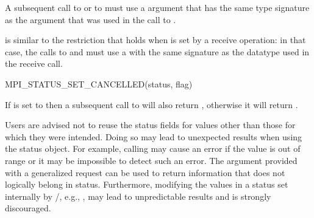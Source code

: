 A subsequent call to  or to
 must use a
 argument that has the same type signature as the
 argument that was used in the call to
.

\begin{rationale}
 is similar to the restriction that holds 
when 
 is set by a
receive operation: in that case, the calls to
 and  must use a
 with the same signature as the datatype used in the
receive call.
\end{rationale}

\begin{funcdef}{MPI\_STATUS\_SET\_CANCELLED(status, flag)}
\end{funcdef}

%



If  is set to  then a subsequent call to 
 will also return ,
otherwise it will return 
.  

\begin{users}
Users are advised not to reuse the status fields for values other than
those for which they were intended.  Doing so may lead to unexpected
results when using the status object.  For example, calling
 may cause an error if the value is
out of range or it may be impossible to detect such an error.  The
 argument provided with a generalized request can
be used to return information that does not logically belong in
status.
Furthermore, modifying the values in a status set internally by \MPI/,
e.g., , may lead to unpredictable results and is
strongly discouraged.
\end{users}



